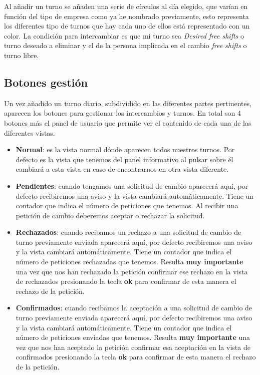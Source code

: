 Al añadir un turno se añaden una serie de círculos al día elegido, que varían en función del tipo de empresa como ya he nombrado previamente, esto representa los diferentes tipo de turnos que hay cada uno de ellos está representado con un color. La condición para intercambiar es que mi turno sea  \emph{Desired free shifts} o turno deseado a eliminar y el de la persona implicada en el cambio  \emph{free shifts} o turno libre.


\subsection{Botones gestión}
Un vez añadido un turno diario, subdividido en las diferentes partes pertinentes, aparecen los botones para gestionar los intercambios y turnos. En total son 4 botones más el panel de usuario que permite ver el contenido de cada una de las diferentes vistas.

\begin{itemize}

\item \textbf{Normal}: es la vista normal dónde aparecen todos nuestros turnos. Por defecto es la vista que tenemos del panel informativo al pulsar sobre él cambiará a esta vista en caso de encontrarnos en otra vista diferente.

\item \textbf{Pendientes}: cuando tengamos una solicitud de cambio aparecerá aquí, por defecto recibiremos una aviso y la vista cambiará automáticamente. Tiene un contador que indica el número de peticiones que tenemos. Al recibir una petición de cambio deberemos aceptar o rechazar la solicitud.

\item \textbf{Rechazados}: cuando recibamos un rechazo a una solicitud de cambio de turno previamente enviada aparecerá aquí, por defecto recibiremos una aviso y la vista cambiará automáticamente. Tiene un contador que indica el número de peticiones rechazadas que tenemos. Resulta \textbf{muy importante} una vez que nos han rechazado la petición confirmar ese rechazo en la vista de rechazados presionando la tecla \textbf{ok} para confirmar de esta manera el rechazo de la petición. 

\item \textbf{Confirmados}: cuando recibamos la aceptación a una solicitud de cambio de turno previamente enviada aparecerá aquí, por defecto recibiremos una aviso y la vista cambiará automáticamente. Tiene un contador que indica el número de peticiones enviadas que tenemos. Resulta \textbf{muy importante} una vez que nos han aceptado la petición confirmar esa aceptación en la vista de confirmados presionando la tecla \textbf{ok} para confirmar de esta manera el rechazo de la petición.




\end{itemize} 


